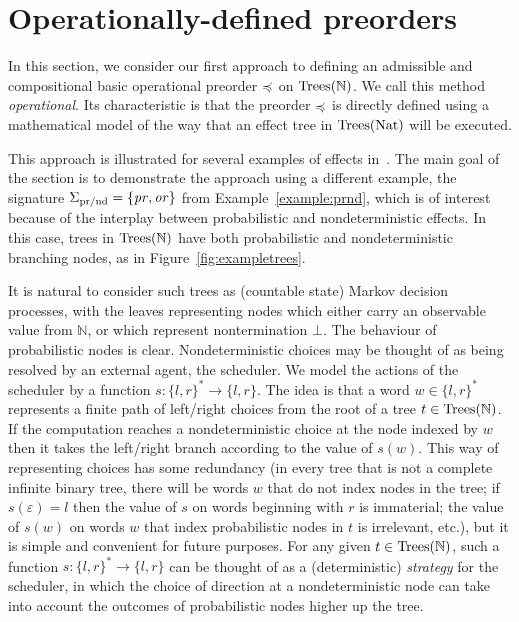 \section{Operationally-defined preorders}

In this section, we consider our first approach to defining an admissible and compositional basic operational
preorder $\preccurlyeq$ on $\textnormal{Trees}(\mathbb{N})$. We call this method \emph{operational}. Its characteristic is that the preorder
 $\preccurlyeq$ is directly defined using a mathematical model of the way that an effect tree in $\textnormal{Trees}(\mathbb{\textnormal{Nat}})$ will be executed.

This approach is illustrated for several examples of effects in~\cite{gom}. 
The main goal of the section is to demonstrate the approach using a different example, the signature
$\Sigma_{\text{pr/nd}} = \{\operatorname{\mathit{pr}},\operatorname{\mathit{or}}\}$ from Example~\ref{example:prnd}, which is of interest because of the 
interplay between probabilistic and nondeterministic effects. 
In this case, trees in $\textnormal{Trees}(\mathbb{N})$ have both probabilistic and nondeterministic branching nodes,
as in Figure~\ref{fig:exampletrees}.


It is natural to consider such trees as (countable state) Markov decision processes, with the leaves representing nodes which either carry an observable value from $\mathbb{N}$, or which represent nontermination $\bot$.
The behaviour of probabilistic nodes is clear. Nondeterministic choices may be thought of as being resolved by an external agent, the scheduler. We model the actions of the scheduler by a 
function $s: \{l,r\}^* \to \{l,r\}$. The idea is that a word $w \in \{l,r\}^*$ represents a finite path of left/right choices from the root of a 
tree $t \in \textnormal{Trees}(\mathbb{N})$. If the computation reaches a nondeterministic choice at the node indexed by 
$w$ then it takes the left/right branch according to the value of $s(w)$. This way of representing choices has some redundancy
(in every tree that is not a complete infinite binary tree, there will be words $w$ that do not index nodes in the tree; if $s(\varepsilon) = l$ then the value of $s$ on words beginning with $r$ is immaterial; the value of $s(w)$ on words $w$ that index 
probabilistic nodes in $t$ is irrelevant, etc.), but it is simple and convenient for future purposes. 
For any given $t \in \textnormal{Trees}(\mathbb{N})$, such a function
$s: \{l,r\}^* \to \{l,r\}$ can be thought of as a (deterministic) \emph{strategy} for the scheduler, in which the choice of direction at a nondeterministic node  
can take into account the outcomes of probabilistic nodes higher up the tree.

